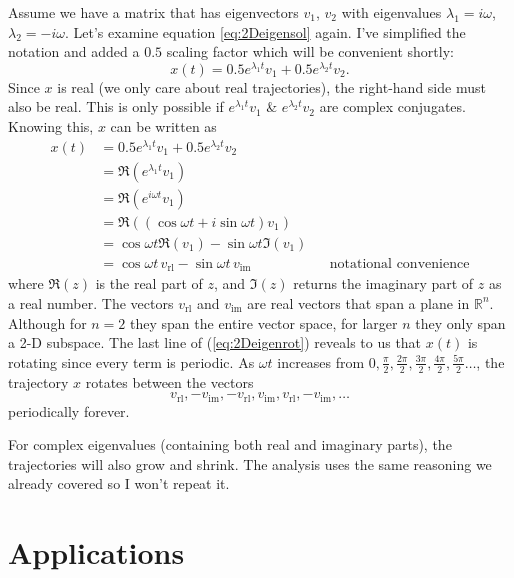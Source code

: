 \documentclass[11pt, oneside]{article}   	%
\begin{document}
Assume we have a matrix that has eigenvectors $v_1$, $v_2$ with eigenvalues $\lambda_1 = i \omega$, $\lambda_2 = -i \omega$.
Let's examine equation \ref*{eq:2Deigensol} again.
I've simplified the notation and added a $0.5$ scaling factor which will be convenient shortly:
\begin{equation}
  x(t) = 0.5 e^{\lambda_1 t}v_1 + 0.5 e^{\lambda_2 t}v_2.
\end{equation}
Since $x$ is real (we only care about real trajectories), the right-hand side must also be real.
This is only possible if $e^{\lambda_1 t}v_{1}$ \& $e^{\lambda_2 t}v_{2}$ are complex conjugates.
Knowing this, $x$ can be written as
\begin{equation} \label{eq:2Deigenrot}
\begin{aligned}
x(t) & = 0.5 e^{\lambda_1 t}v_1 + 0.5 e^{\lambda_2 t}v_2 \\
     & = \Re(e^{\lambda_1 t}v_1) \\
     & = \Re(e^{i\omega t}v_1) \\
     & = \Re((\cos \omega t + i \sin \omega t) v_1) \\
     & = \cos \omega t \Re(v_1) - \sin \omega t \Im(v_1) \\
     & = \cos \omega t \, v_\mathrm{rl} - \sin \omega t \, v_\mathrm{im} && \text{notational convenience}
\end{aligned}
\end{equation}
where $\Re(z)$ is the real part of $z$, and $\Im(z)$ returns the imaginary part of $z$ as a real number.
The vectors $v_\mathrm{rl}$ and $v_\mathrm{im}$ are real vectors that span a plane in $\mathbb{R}^n$.
Although for $n = 2$ they span the entire vector space, for larger $n$ they only span a 2-D subspace.
The last line of (\ref*{eq:2Deigenrot}) reveals to us that $x(t)$ is rotating since every term is periodic.
As $\omega t$ increases from $0,\frac{\pi}{2},\frac{2\pi}{2},\frac{3\pi}{2},\frac{4\pi}{2},\frac{5\pi}{2}\dots$,
the trajectory $x$ rotates between the vectors
$$ v_\mathrm{rl}, -v_\mathrm{im}, -v_\mathrm{rl}, v_\mathrm{im}, v_\mathrm{rl}, -v_\mathrm{im}, \dots $$
periodically forever.

For complex eigenvalues (containing both real and imaginary parts), the trajectories will also grow and shrink.
The analysis uses the same reasoning we already covered so I won't repeat it.


\section{Applications}
\end{document}
